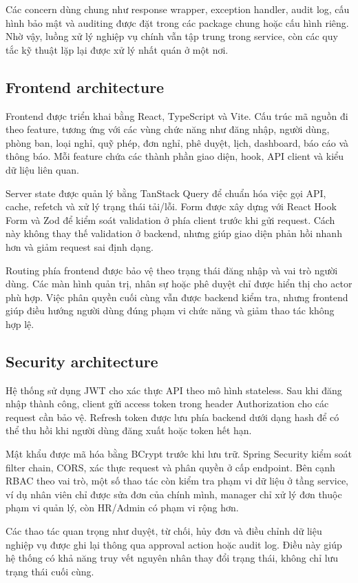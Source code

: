 Các concern dùng chung như response wrapper, exception handler, audit log, cấu hình bảo mật và auditing được đặt trong các package chung hoặc cấu hình riêng. Nhờ vậy, luồng xử lý nghiệp vụ chính vẫn tập trung trong service, còn các quy tắc kỹ thuật lặp lại được xử lý nhất quán ở một nơi.

\subsection{Frontend architecture}
Frontend được triển khai bằng React, TypeScript và Vite. Cấu trúc mã nguồn đi theo feature, tương ứng với các vùng chức năng như đăng nhập, người dùng, phòng ban, loại nghỉ, quỹ phép, đơn nghỉ, phê duyệt, lịch, dashboard, báo cáo và thông báo. Mỗi feature chứa các thành phần giao diện, hook, API client và kiểu dữ liệu liên quan.

Server state được quản lý bằng TanStack Query để chuẩn hóa việc gọi API, cache, refetch và xử lý trạng thái tải/lỗi. Form được xây dựng với React Hook Form và Zod để kiểm soát validation ở phía client trước khi gửi request. Cách này không thay thế validation ở backend, nhưng giúp giao diện phản hồi nhanh hơn và giảm request sai định dạng.

Routing phía frontend được bảo vệ theo trạng thái đăng nhập và vai trò người dùng. Các màn hình quản trị, nhân sự hoặc phê duyệt chỉ được hiển thị cho actor phù hợp. Việc phân quyền cuối cùng vẫn được backend kiểm tra, nhưng frontend giúp điều hướng người dùng đúng phạm vi chức năng và giảm thao tác không hợp lệ.

\subsection{Security architecture}
Hệ thống sử dụng JWT cho xác thực API theo mô hình stateless. Sau khi đăng nhập thành công, client gửi access token trong header Authorization cho các request cần bảo vệ. Refresh token được lưu phía backend dưới dạng hash để có thể thu hồi khi người dùng đăng xuất hoặc token hết hạn.

Mật khẩu được mã hóa bằng BCrypt trước khi lưu trữ. Spring Security kiểm soát filter chain, CORS, xác thực request và phân quyền ở cấp endpoint. Bên cạnh RBAC theo vai trò, một số thao tác còn kiểm tra phạm vi dữ liệu ở tầng service, ví dụ nhân viên chỉ được sửa đơn của chính mình, manager chỉ xử lý đơn thuộc phạm vi quản lý, còn HR/Admin có phạm vi rộng hơn.

Các thao tác quan trọng như duyệt, từ chối, hủy đơn và điều chỉnh dữ liệu nghiệp vụ được ghi lại thông qua approval action hoặc audit log. Điều này giúp hệ thống có khả năng truy vết nguyên nhân thay đổi trạng thái, không chỉ lưu trạng thái cuối cùng.

